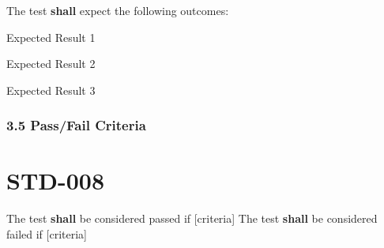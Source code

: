 The test \textbf{shall} expect the following outcomes:
\begin{itemizeDeep}
\item [Expected Result 1]
\item [Expected Result 2]
\item [Expected Result 3]
\end{itemizeDeep}

\subsubsection{3.5 Pass/Fail Criteria}

\section{STD-008}\label{STD-008}

The test \textbf{shall} be considered passed if [criteria]
The test \textbf{shall} be considered failed if [criteria]

